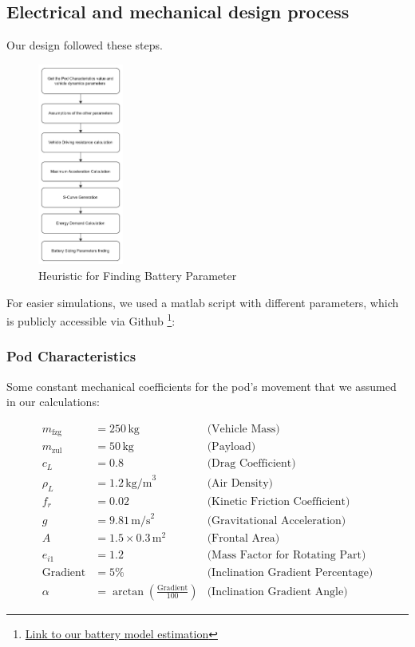 \subsection{Electrical and mechanical design process}
Our design followed these steps.
\begin{figure}
    \centering
    \includegraphics[width=0.25\textwidth]{texfiles/elec/eimg/BatteryDesignProcess}
    \caption{Heuristic for Finding Battery Parameter}
\end{figure}
For easier simulations, we used a matlab script with different parameters, which is publicly accessible via Github \footnote{\href{https://github.com/Team-Tachyon-e-V/battery_model}{Link to our battery model estimation}}:
\subsubsection*{Pod Characteristics} 
Some constant mechanical coefficients for the pod's movement that we assumed in our calculations:

\begin{align*}
m_{\text{fzg}} &= 250 \, \text{kg} & \text{(Vehicle Mass)} \\
m_{\text{zul}} &= 50 \, \text{kg} & \text{(Payload)} \\
c_L &= 0.8 & \text{(Drag Coefficient)} \\
\rho_L &= 1.2 \, \text{kg/m}^3 & \text{(Air Density)} \\
f_r &= 0.02 & \text{(Kinetic Friction Coefficient)} \\
g &= 9.81 \, \text{m/s}^2 & \text{(Gravitational Acceleration)} \\
A &= 1.5 \times 0.3 \, \text{m}^2 & \text{(Frontal Area)} \\
e_{i1} &= 1.2 & \text{(Mass Factor for Rotating Part)} \\
\text{Gradient} &= 5\% & \text{(Inclination Gradient Percentage)} \\
\alpha &= \arctan\left(\frac{\text{Gradient}}{100}\right) & \text{(Inclination Gradient Angle)}
\end{align*}

